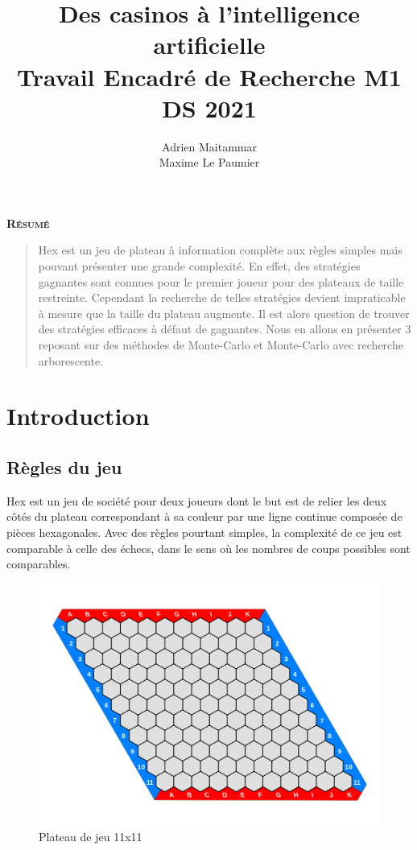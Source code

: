 \documentclass[a4paper]{article}
\title{\huge Des casinos à l'intelligence artificielle\\[15pt] \small Travail Encadré de Recherche M1 DS 2021}
\author{Adrien Maitammar \\ Maxime Le Paumier}
\theoremstyle{definition}
\renewenvironment{abstract}
{
	\centerline
	{\large \bfseries \scshape Résumé}
	\begin{quote}
	}
	{
	\end{quote}
}
\begin{document}
\maketitle

\vspace{40pt}

\begin{abstract}
Hex est un jeu de plateau à information complète aux règles simples mais pouvant présenter une grande complexité. En effet, des stratégies gagnantes sont connues pour le premier joueur pour des plateaux de taille restreinte. Cependant la recherche de telles stratégies devient impraticable à mesure que la taille du plateau augmente. Il est alors question de trouver des stratégies efficaces à défaut de gagnantes. Nous en allons en présenter 3 reposant sur des méthodes de Monte-Carlo et Monte-Carlo avec recherche arborescente. 
\end{abstract}
\newpage

\renewcommand{\contentsname}{Sommaire}
\tableofcontents
 \clearpage
 
 
\section{Introduction}

\subsection{Règles du jeu}

Hex est un jeu de société pour deux joueurs dont le but est de relier les deux côtés du plateau correspondant à sa couleur par une ligne continue composée de pièces hexagonales. Avec des règles pourtant simples, la complexité de ce jeu est comparable à celle des échecs, dans le sens où les nombres de coups possibles sont comparables. 

\begin{figure}[h]
	\centering
	\includegraphics[scale=0.13]{11x11.png}
	\caption{Plateau de jeu 11x11}
\end{figure}
\end{document}
